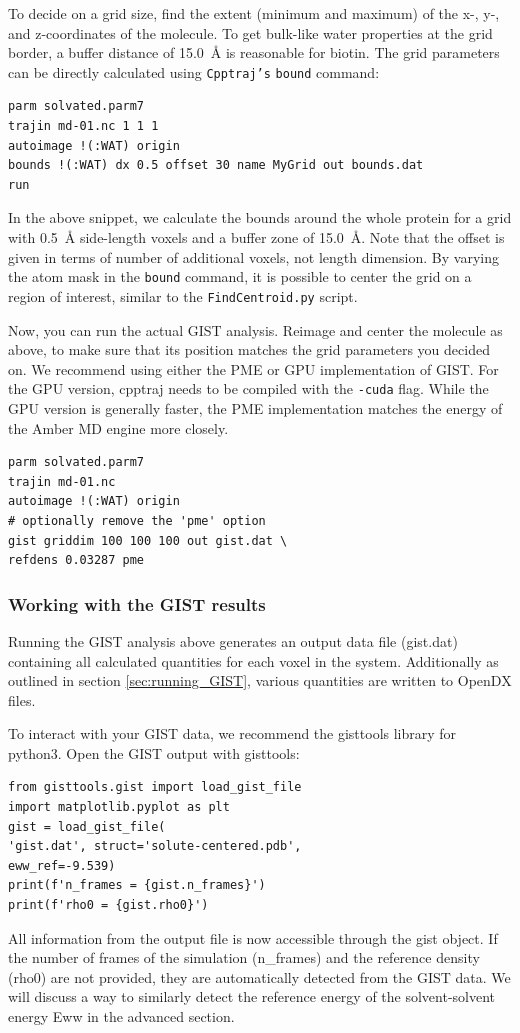 \documentclass[9pt,tutorial]{livecoms}
\newcommand{\software}{\texttt}
\newcommand\inlinecode{\texttt}
\begin{document}
To decide on a grid size, find the extent (minimum and maximum) of the x-, \mbox{y-,} and z-coordinates of the molecule.
To get bulk-like water properties at the grid border, a buffer distance of \SI{15.0}{\angstrom} is reasonable for biotin.
The grid parameters can be directly calculated using \software{Cpptraj's} \inlinecode{bound} command:
\begin{lstlisting}[style=cpptraj]
parm solvated.parm7
trajin md-01.nc 1 1 1
autoimage !(:WAT) origin
bounds !(:WAT) dx 0.5 offset 30 name MyGrid out bounds.dat
run
\end{lstlisting}
In the above snippet, we calculate the bounds around the whole protein for a grid with \SI{0.5}{\angstrom} side-length voxels and a buffer zone of \SI{15.0}{\angstrom}. Note that the offset is given in terms of number of additional voxels, not length dimension. By varying the atom mask in the \inlinecode{bound} command, it is possible to center the grid on a region of interest, similar to the \software{FindCentroid.py} script.


Now, you can run the actual GIST analysis.
Reimage and center the molecule as above, to make sure that its position matches the grid parameters you decided on.
We recommend using either the PME or GPU implementation of GIST.
For the GPU version, cpptraj needs to be compiled with the \inlinecode{-cuda} flag.
While the GPU version is generally faster, the PME implementation matches the energy of the Amber MD engine more closely.


\begin{lstlisting}[style=cpptraj]
parm solvated.parm7
trajin md-01.nc
autoimage !(:WAT) origin
# optionally remove the 'pme' option
gist griddim 100 100 100 out gist.dat \
refdens 0.03287 pme
\end{lstlisting}
\subsubsection{Working with the GIST results}
Running the GIST analysis above generates an output data file (gist.dat) containing all calculated quantities for each voxel in the system. 
Additionally as outlined in section \ref{sec:running_GIST}, various quantities are written to OpenDX files.

To interact with your GIST data, we recommend the gisttools library for python3. Open the GIST output with gisttools:
\begin{lstlisting}[style=python]
from gisttools.gist import load_gist_file
import matplotlib.pyplot as plt
gist = load_gist_file(
'gist.dat', struct='solute-centered.pdb',  
eww_ref=-9.539)
print(f'n_frames = {gist.n_frames}')
print(f'rho0 = {gist.rho0}')
\end{lstlisting}
All information from the output file is now accessible through the gist object. 
If the number of frames of the simulation (n\_frames) and the reference density (rho0) are not provided, they are automatically detected from the GIST data. 
We will discuss a way to similarly detect the reference energy of the solvent-solvent energy Eww in the advanced section.
\end{document}
